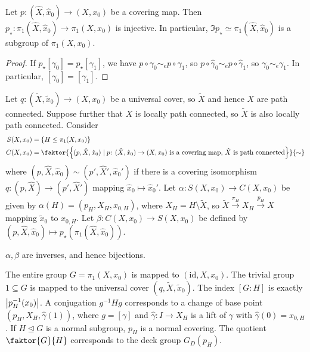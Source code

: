 \begin{proposition}
	Let \( p \colon (\hat X, \hat x_0) \to (X, x_0) \) be a covering map.
	Then \( p_\star \colon \pi_1(\hat X, \hat x_0) \to \pi_1(X, x_0) \) is injective.
	In particular, \( \Im p_\star \simeq \pi_1(\hat X, \hat x_0) \) is a subgroup of \( \pi_1(X, x_0) \).
\end{proposition}
\begin{proof}
	If \( p_\star[\gamma_0] = p_\star[\gamma_1] \), we have \( p \circ \gamma_0 \sim_e p \circ \gamma_1 \), so \( p \circ \hat\gamma_0 \sim_e p \circ \hat\gamma_1 \), so \( \gamma_0 \sim_e \gamma_1 \).
	In particular, \( [\gamma_0] = [\gamma_1] \).
\end{proof}

Let \( q \colon (\widetilde X, \widetilde x_0) \to (X, x_0) \) be a universal cover, so \( \widetilde X \) and hence \( X \) are path connected.
Suppose further that \( X \) is locally path connected, so \( \widetilde X \) is also locally path connected.
Consider
\begin{align*}
	S(X,x_0) &= \qty{H \leq \pi_1(X,x_0)} \\
	C(X,x_0) &= \faktor{\qty{(p,\hat X, \hat x_0) \mid p \colon (\hat X, \hat x_0) \to (X,x_0) \text{ is a covering map, } \hat X \text{ is path connected}}}{\sim}
\end{align*}
where \( (p, \hat X, \hat x_0) \sim (p', \hat X', \hat x_0') \) if there is a covering isomorphism \( q \colon (p, \hat X) \to (p', \hat X') \) mapping \( \hat x_0 \mapsto \hat x_0' \).
Let \( \alpha \colon S(X,x_0) \to C(X,x_0) \) be given by \( \alpha(H) = (p_H, X_H, x_{0,H}) \), where \( X_H = H \setminus \widetilde X \), so \( \widetilde X \xrightarrow{\pi_H} X_H \xrightarrow{p_H} X \) mapping \( \widetilde x_0 \) to \( x_{0,H} \).
Let \( \beta \colon C(X,x_0) \to S(X,x_0) \) be defined by \( (p, \hat X, \hat x_0) \mapsto p_\star(\pi_1(\hat X, \hat x_0)) \).
\begin{theorem}
	\( \alpha, \beta \) are inverses, and hence bijections.
\end{theorem}
\begin{remark}
	The entire group \( G = \pi_1(X,x_0) \) is mapped to \( (\mathrm{id}, X, x_0) \).
	The trivial group \( 1 \subseteq G \) is mapped to the universal cover \( (q, \widetilde X, \widetilde x_0) \).
	The index \( [G : H] \) is exactly \( \abs{p_H^{-1}(x_0)} \).
	A conjugation \( g^{-1}Hg \) corresponds to a change of base point \( (p_H, X_H, \hat\gamma(1)) \), where \( g = [\gamma] \) and \( \hat\gamma \colon I \to X_H \) is a lift of \( \gamma \) with \( \hat\gamma(0) = x_{0,H} \).
	If \( H \trianglelefteq G \) is a normal subgroup, \( p_H \) is a normal covering.
	The quotient \( \faktor{G}{H} \) corresponds to the deck group \( G_D(p_H) \).
\end{remark}
